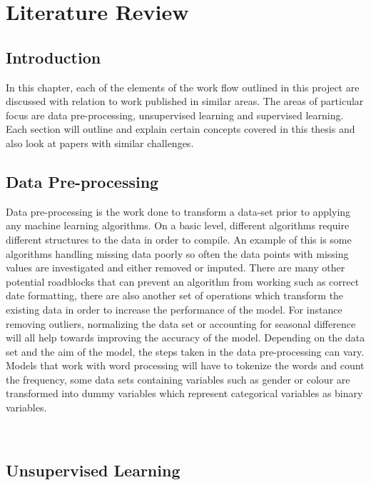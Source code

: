 \chapter{Literature Review}
\section{Introduction}
In this chapter, each of the elements of the work flow outlined in this project are discussed with relation to work published in similar areas. The areas of particular focus are data pre-processing, unsupervised learning and supervised learning. Each section will outline and explain certain concepts covered in this thesis and also look at papers with similar challenges.
\section{Data Pre-processing}
Data pre-processing is the work done to transform a data-set prior to applying any machine learning algorithms. On a basic level, different algorithms require different structures to the data in order to compile. An example of this is some algorithms handling missing data poorly so often the data points with missing values are investigated and either removed or imputed. There are many other potential roadblocks that can prevent an algorithm from working such as correct date formatting, there are also another set of operations which transform the existing data in order to increase the performance of the model. For instance removing outliers, normalizing the data set or accounting for seasonal difference will all help towards improving the accuracy of the model. Depending on the data set and the aim of the model, the steps taken in the data pre-processing can vary. Models that work with word processing will have to tokenize the words and count the frequency, some data sets containing variables such as gender or colour are transformed into dummy variables which represent categorical variables as binary variables.

\\


\section{Unsupervised Learning}
